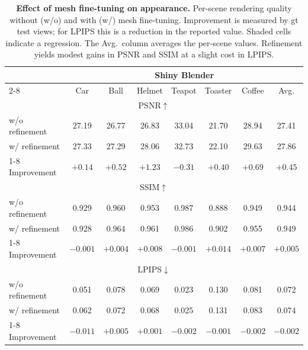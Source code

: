 \begin{table}[t]
  \centering
  \footnotesize
  \setlength{\tabcolsep}{3pt}
  \caption{\textbf{Effect of mesh fine-tuning on appearance.}
  Per-scene rendering quality without (w/o) and with (w/) mesh fine-tuning.
  Improvement is measured by gt test views; for LPIPS this is a reduction in the reported value. Shaded
  cells indicate a regression. The Avg.\ column averages the per-scene values.
  Refinement yields modest gains in PSNR and SSIM at a slight cost in LPIPS.}
  \label{tab:mesh_appearance}
  \begin{tabular}{lccccccc}
    \toprule
    & \multicolumn{7}{c}{Shiny Blender} \\
    \cmidrule(lr){2-8}
    & Car & Ball & Helmet & Teapot & Toaster & Coffee & Avg. \\
    \midrule
    \multicolumn{8}{c}{PSNR$\uparrow$} \\
    \midrule
    w/o refinement & 27.19 & 26.77 & 26.83 & 33.04 & 21.70 & 28.94 & 27.41 \\
    w/ refinement  & 27.33 & 27.29 & 28.06 & 32.73 & 22.10 & 29.63 & 27.86 \\
    \cmidrule(lr){1-8}
    Improvement & $+0.14$ & $+0.52$ & $+1.23$ & \cellcolor{red!15} $-0.31$ & $+0.40$ & $+0.69$ & $+0.45$ \\
    \midrule
    \multicolumn{8}{c}{SSIM$\uparrow$} \\
    \midrule
    w/o refinement & 0.929 & 0.960 & 0.953 & 0.987 & 0.888 & 0.949 & 0.944 \\
    w/ refinement  & 0.928 & 0.964 & 0.961 & 0.986 & 0.902 & 0.955 & 0.949 \\
    \cmidrule(lr){1-8}
    Improvement & \cellcolor{red!15} $-0.001$ & $+0.004$ & $+0.008$ & \cellcolor{red!15} $-0.001$ & $+0.014$ & $+0.007$ & $+0.005$ \\
    \midrule
    \multicolumn{8}{c}{LPIPS$\downarrow$} \\
    \midrule
    w/o refinement & 0.051 & 0.078 & 0.069 & 0.023 & 0.130 & 0.081 & 0.072 \\
    w/ refinement  & 0.062 & 0.072 & 0.068 & 0.025 & 0.131 & 0.083 & 0.074 \\
    \cmidrule(lr){1-8}
    Improvement & \cellcolor{red!15} $-0.011$ & $+0.005$ & $+0.001$ & \cellcolor{red!15} $-0.002$ & \cellcolor{red!15} $-0.001$ & \cellcolor{red!15} $-0.002$ & \cellcolor{red!15} $-0.002$ \\
    \bottomrule
  \end{tabular}
\end{table}
